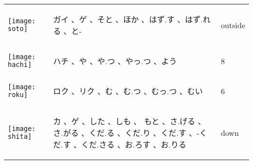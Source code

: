 \documentclass[a4paper,12pt]{extarticle}
\begin{document}
\begin{longtable}{|lp{6cm}p{4cm}|}
	\begin{minipage}{0.3\textwidth}
		\centerline{
			\texttt{[image: soto]}
		}
	\end{minipage}
	                                   &
	\begin{CJK}{UTF8}{min} ガイ 、ゲ 、そと 、ほか 、はず.す 、はず.れる 、と-\end{CJK}
	                                   &
	outside
	\\
	\begin{minipage}{0.3\textwidth}
		\centerline{
			\texttt{[image: hachi]}
		}
	\end{minipage}
	                                   &
	\begin{CJK}{UTF8}{min} ハチ 、や 、や.つ 、やっ.つ 、よう\end{CJK}
	                                   &
	8
	\\
	\begin{minipage}{0.3\textwidth}
		\centerline{
			\texttt{[image: roku]}
		}
	\end{minipage}
	                                   &
	\begin{CJK}{UTF8}{min} ロク 、リク 、む 、む.つ 、むっ.つ 、むい\end{CJK}
	                                   &
	6
	\\
	\begin{minipage}{0.3\textwidth}
		\centerline{
			\texttt{[image: shita]}
		}
	\end{minipage}
	                                   &
	\begin{CJK}{UTF8}{min} カ 、ゲ 、した 、しも 、 もと 、さ.げる 、さ.がる 、くだ.る 、くだ.り 、くだ.す 、-くだ.す 、くだ.さる 、お.ろす 、お.りる\end{CJK}
	                                   &
	down
	\\

\end{longtable}
\end{document}
